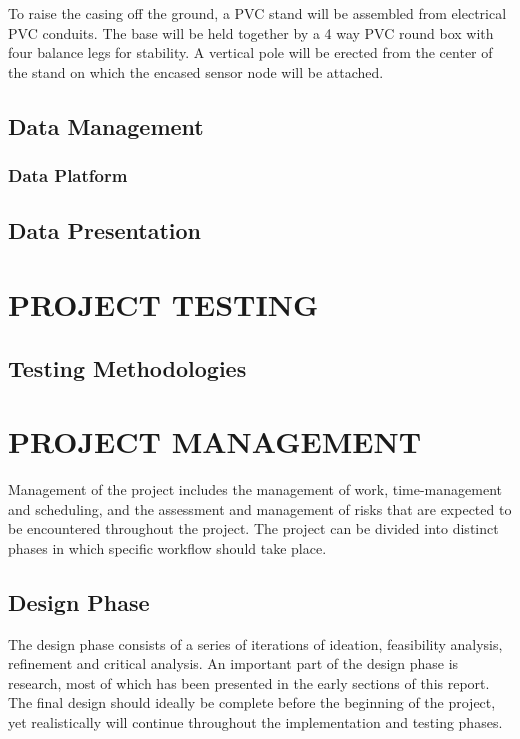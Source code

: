 \documentclass[10pt,twocolumn]{witseiepaper}
\begin{document}
		To raise the casing off the ground, a PVC stand will be assembled from electrical PVC conduits. The base will be held together by a 4 way PVC round box with four balance legs for stability. A vertical pole will be erected from the center of the stand on which the encased sensor node will be attached.
	
	\subsection{Data Management}

	\subsubsection{Data Platform}

	\subsection{Data Presentation}
	
\section{PROJECT TESTING}
	\subsection{Testing Methodologies}


\section{PROJECT MANAGEMENT}

	Management of the project includes the management of work, time-management and scheduling, and the assessment and management of risks that are expected to be encountered throughout the project. The project can be divided into distinct phases in which specific workflow should take place.
	
	\subsection{Design Phase}
		The design phase consists of a series of iterations of ideation, feasibility analysis, refinement and critical analysis. An important part of the design phase is research, most of which has been presented in the early sections of this report. The final design should ideally be complete before the beginning of the project, yet realistically will continue throughout the implementation and testing phases. 
		
\end{document}
